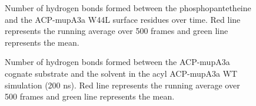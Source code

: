 \begin{singlespacing}
		\setlength\fboxsep{5pt}
		\setlength\fboxrule{1.5pt}
		\begin{figure}[htbp]
		\centering
		\caption[Number of hydrogen bonds formed between the phosphopantetheine and the ACP-mupA3a W44L surface residues over time.]{Number of hydrogen bonds formed between the phosphopantetheine and the ACP-mupA3a W44L surface residues over time.  Red line represents the running average over 500 frames and green line represents the mean.}
		\label{fig:HbondACPSPMMutant_protein}
		\end{figure}

		\setlength\fboxsep{5pt}
		\setlength\fboxrule{1.5pt}
		\begin{figure}[htbp]
		\centering
		\caption[Number of hydrogen bonds formed between the ACP-mupA3a cognate substrate and the solvent in the acyl ACP-mupA3a WT simulation (200 ns).]{Number of hydrogen bonds formed between the ACP-mupA3a cognate substrate and the solvent in the acyl ACP-mupA3a WT simulation (200 ns).  Red line represents the running average over 500 frames and green line represents the mean.}
		\label{fig:HbondACPSPMWild200_solvent}
		\end{figure}


\end{singlespacing}
